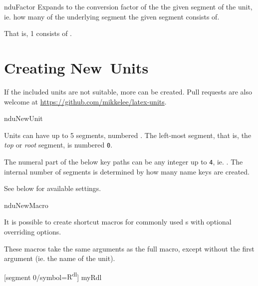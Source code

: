 \documentclass{article}
\begin{document}
\begin{docCommand}
	{nduFactor}
	{}
	Expands to the conversion factor of the the given segment of the unit, ie. how many of the underlying segment the given segment consists of.

\begin{dispExample}
That is, 1  consists of
 .
\end{dispExample}
\end{docCommand}

\section{Creating New Units} %

\label{units:new}
If the included units are not suitable, more can be created. Pull requests are also welcome at \url{https://github.com/mikkelee/latex-units}.

\begin{docCommand}
	{nduNewUnit}
	{}
	
Units can have up to 5 segments, numbered . The left-most segment, that is, the \emph{top} or \emph{root} segment, is numbered \texttt{0}.

The numeral part of the below key paths  can be any integer up to \texttt{4}, ie. . The internal number of segments is determined by how many name keys are created.

See below for available settings.

\end{docCommand}

\begin{docCommand}
	{nduNewMacro}
	{}

	It is possible to create shortcut macros for commonly used s with optional overriding options.

	These macros take the same arguments as the full  macro, except without the first argument (ie. the name of the unit).

\begin{dispExample}
	[segment 0/symbol={R\textsuperscript{dl}}]
	{myRdl}
\end{dispExample}

\end{docCommand}
\end{document}
